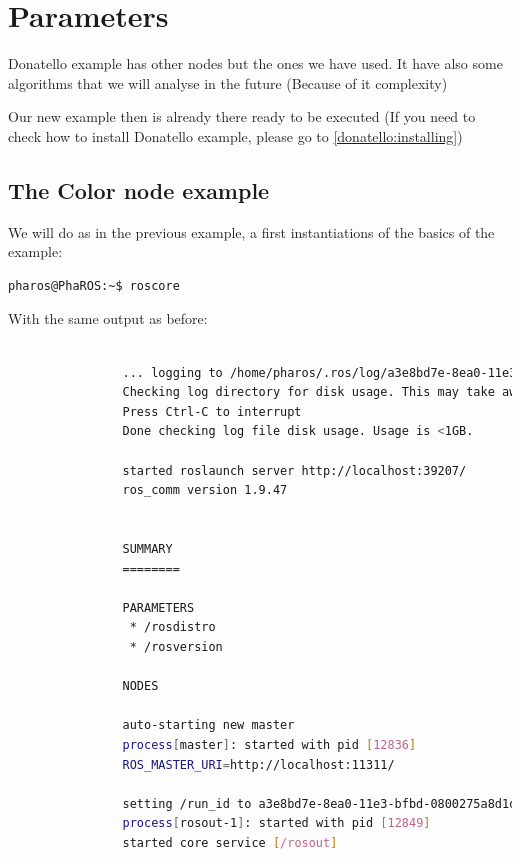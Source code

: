 \documentclass[a4paper,10pt,twoside]{book}
\begin{document}
\fi
\sloppy
\chapter{Parameters}
				
				Donatello example has other nodes but the ones we have used. It have also some algorithms that we will analyse in the future (Because of it complexity) 
					
				Our new example then is already there ready to be executed (If you need to check how to install Donatello example, please go to \autoref{donatello:installing})					
					
			\section {The Color node example}		
					
					We will do as in the previous example, a first instantiations of the basics of the example:
				
			\begin{lstlisting}[language=bash,title={Starting up ROS}]
				pharos@PhaROS:~$ roscore
			\end{lstlisting}
			
			With the same output as before:
			
			\begin{lstlisting}[language=bash,title={Starting up ROS - Output}]
				
				... logging to /home/pharos/.ros/log/a3e8bd7e-8ea0-11e3-bfbd-0800275a8d1d/roslaunch-PhaROS-12822.log
				Checking log directory for disk usage. This may take awhile.
				Press Ctrl-C to interrupt
				Done checking log file disk usage. Usage is <1GB.

				started roslaunch server http://localhost:39207/
				ros_comm version 1.9.47


				SUMMARY
				========

				PARAMETERS
				 * /rosdistro
				 * /rosversion

				NODES

				auto-starting new master
				process[master]: started with pid [12836]
				ROS_MASTER_URI=http://localhost:11311/

				setting /run_id to a3e8bd7e-8ea0-11e3-bfbd-0800275a8d1d
				process[rosout-1]: started with pid [12849]
				started core service [/rosout]
			\end{lstlisting}
			
\end{document}
